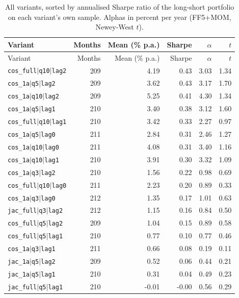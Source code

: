 \begin{longtable}{lrrrrr}
\caption{All variants, sorted by annualised Sharpe ratio of the long-short portfolio on each variant's own sample. Alphas in percent per year (FF5+MOM, Newey-West $t$).}\label{tab:trials}\\
\toprule Variant & Months & Mean (\% p.a.) & Sharpe & $\alpha$ & $t$ \\ \midrule \endfirsthead
\toprule Variant & Months & Mean (\% p.a.) & Sharpe & $\alpha$ & $t$ \\ \midrule \endhead
\bottomrule \endfoot
\texttt{cos\_full$\mid$q10$\mid$lag2} & 209 & 4.19 & 0.43 & 3.03 & 1.34 \\
\texttt{cos\_1a$\mid$q5$\mid$lag2} & 209 & 3.62 & 0.43 & 3.17 & 1.70 \\
\texttt{cos\_1a$\mid$q10$\mid$lag2} & 209 & 5.25 & 0.41 & 4.30 & 1.34 \\
\texttt{cos\_1a$\mid$q5$\mid$lag1} & 210 & 3.40 & 0.38 & 3.12 & 1.60 \\
\texttt{cos\_full$\mid$q10$\mid$lag1} & 210 & 3.42 & 0.33 & 2.27 & 0.97 \\
\texttt{cos\_1a$\mid$q5$\mid$lag0} & 211 & 2.84 & 0.31 & 2.46 & 1.27 \\
\texttt{cos\_1a$\mid$q10$\mid$lag0} & 211 & 4.08 & 0.31 & 3.40 & 1.16 \\
\texttt{cos\_1a$\mid$q10$\mid$lag1} & 210 & 3.91 & 0.30 & 3.32 & 1.09 \\
\texttt{cos\_1a$\mid$q3$\mid$lag2} & 210 & 1.56 & 0.22 & 0.98 & 0.69 \\
\texttt{cos\_full$\mid$q10$\mid$lag0} & 211 & 2.23 & 0.20 & 0.89 & 0.33 \\
\texttt{cos\_1a$\mid$q3$\mid$lag0} & 212 & 1.35 & 0.17 & 1.01 & 0.63 \\
\texttt{jac\_full$\mid$q3$\mid$lag2} & 212 & 1.15 & 0.16 & 0.84 & 0.50 \\
\texttt{cos\_full$\mid$q5$\mid$lag2} & 209 & 1.04 & 0.15 & 0.89 & 0.58 \\
\texttt{cos\_full$\mid$q5$\mid$lag1} & 210 & 0.77 & 0.10 & 0.77 & 0.46 \\
\texttt{cos\_1a$\mid$q3$\mid$lag1} & 211 & 0.66 & 0.08 & 0.19 & 0.11 \\
\texttt{jac\_1a$\mid$q5$\mid$lag2} & 209 & 0.52 & 0.06 & 0.44 & 0.21 \\
\texttt{jac\_1a$\mid$q5$\mid$lag1} & 210 & 0.31 & 0.04 & 0.49 & 0.23 \\
\texttt{jac\_full$\mid$q5$\mid$lag1} & 210 & -0.01 & -0.00 & 0.56 & 0.29 \\

\end{longtable}
